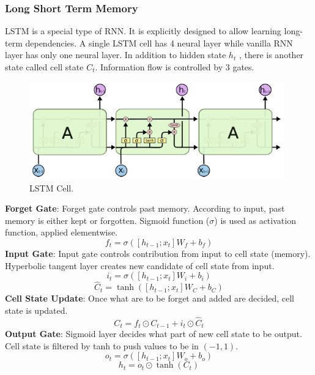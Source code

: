 \subsubsection{Long Short Term Memory}
LSTM is a special type of RNN. It is explicitly designed to allow learning long-term dependencies. A single LSTM cell has 4 neural layer while vanilla RNN layer has only one neural layer. In addition to hidden state $h_t$ , there is another state called cell state $C_t$. Information flow is controlled by 3 gates. \\
\begin{figure}
	\centering
	\includegraphics[width=0.98\textwidth]{figures/ml_theory/lstm/lstm_module.png}
	\caption{LSTM Cell.}
	\label{fig:lstm_cell}
\end{figure}
\textbf{Forget Gate}: Forget gate controls past memory. According to input, past memory is either kept or forgotten. Sigmoid function ($\sigma$) is used as activation function, applied elementwise. \\
\begin{equation}
\label{eqn:lstm_forget}
f_t = \sigma( [h_{t-1}; x_t] W_f + b_f) 
\end{equation}
\textbf{Input Gate}: Input gate controls contribution from input to cell state (memory). Hyperbolic tangent layer creates new candidate of cell state from input. \\
\begin{equation}
\label{eqn:lstm_inp}
i_t = \sigma( [h_{t-1}; x_t] W_i + b_{i}) 
\end{equation}
\begin{equation}
\label{eqn:lstm_cellstcand}
\hat{C}_t = \tanh( [h_{t-1}; x_t] W_C + b_C) 
\end{equation}
\textbf{Cell State Update}: Once what are to be forget and added are decided, cell state is updated. \\
\begin{equation}
\label{eqn:lstm_cellstupt}
C_t = f_t \odot C_{t-1} + i_t \odot \hat{C}_t
\end{equation}
\textbf{Output Gate}: Sigmoid layer decides what part of new cell state to be output. Cell state is filtered by tanh to push values to be in $(-1,1)$. \\
\begin{equation}
\label{eqn:lstm_out}
o_t = \sigma( [h_{t-1}; x_t] W_o + b_o) 
\end{equation}
\begin{equation}
h_t = o_t \odot \tanh(C_t)
\end{equation}
%
